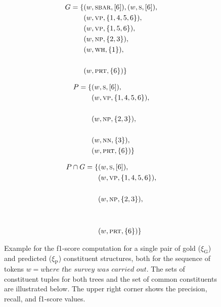 \documentclass[../document.tex]{subfiles}
\begin{document}
\begin{figure}
        \begin{minipage}{.35\linewidth}
            \small
            \begin{align*}
                G = \{
                &(w, \textsc{sbar}, [6]),
                (w, \textsc{s}, [6]), \\
                &(w, \textsc{vp}, \{1,4,5,6\}),\\
                &(w, \textsc{vp}, \{1,5,6\}), \\
                &(w, \textsc{np}, \{2,3\}), \\
                &(w, \textsc{wh}, \{1\}), \\ \\
                &(w, \textsc{prt}, \{6\}) \}
            \end{align*}
        \end{minipage}
        \hfill
        \begin{minipage}{.3\linewidth}
            \small
            \begin{align*}
                P = \{
                &(w, \textsc{s}, [6]), \\
                &(w, \textsc{vp}, \{1,4,5,6\}),\\ \\
                &(w, \textsc{np}, \{2,3\}),\\ \\
                &(w, \textsc{nn}, \{3\}), \\
                &(w, \textsc{prt}, \{6\}) \}
            \end{align*}
        \end{minipage}
        \hfill
        \begin{minipage}{.3\linewidth}
            \small
            \begin{align*}
                P \cap G = \{
                &(w, \textsc{s}, [6]), \\
                &(w, \textsc{vp}, \{1,4,5,6\}),\\ \\
                &(w, \textsc{np}, \{2,3\}), \\ \\ \\
                &(w, \textsc{prt}, \{6\}) \}
            \end{align*}
        \end{minipage}

        \caption{\label{fig:ex:f1}
            Example for the f1-score computation for a single pair of gold (\(\xi_\text{G}\)) and predicted (\(\xi_\text{P}\)) constituent structures, both for the sequence of tokens \(w = \textit{where the survey was carried out}\).
            The sets of constituent tuples for both trees and the set of common constituents are illustrated below.
            The upper right corner shows the precision, recall, and f1-score values.
        }
    \end{figure}
\end{document}
